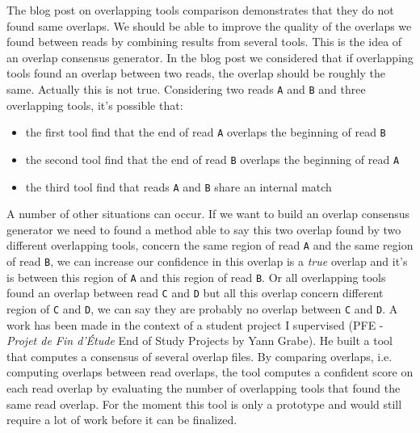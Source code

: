 \documentclass[main.tex]{subfiles}
\begin{document}
The blog post on overlapping tools comparison demonstrates that they do not found same overlaps. We should be able to improve the quality of the overlaps we found between reads by combining results from several tools. This is the idea of an overlap consensus generator. In the blog post we considered that if overlapping tools found an overlap between two reads, the overlap should be roughly the same. Actually this is not true. Considering two reads \texttt{A} and \texttt{B} and three overlapping tools, it's possible that:
\begin{itemize}
    \item the first tool find that the end of read \texttt{A} overlaps the beginning of read \texttt{B}
    \item the second tool find that the end of read \texttt{B} overlaps the beginning of read \texttt{A}
    \item the third tool find that reads \texttt{A} and \texttt{B} share an internal match
\end{itemize}
A number of other situations can occur. If we want to build an overlap consensus generator we need to found a method able to say this two overlap found by two different overlapping tools, concern the same region of read \texttt{A} and the same region of read \texttt{B}, we can increase our confidence in this overlap is a \textit{true} overlap and it's is between this region of \texttt{A} and this region of read \texttt{B}. Or all overlapping tools found an overlap between read \texttt{C} and \texttt{D} but all this overlap concern different region of \texttt{C} and \texttt{D}, we can say they are probably no overlap between \texttt{C} and \texttt{D}.
A work has been  made in the context of a student project I supervised (PFE - \textit{Projet de Fin d'Étude} End of Study Projects by Yann Grabe). He built a tool that computes a consensus of several overlap files. By comparing overlaps, i.e. computing overlaps between read overlaps, the tool computes a confident score on each read overlap by evaluating the number of overlapping tools that found the same read overlap. For the moment this tool is only a prototype and would still require a lot of work before it can be finalized. 

%
%
\end{document}
